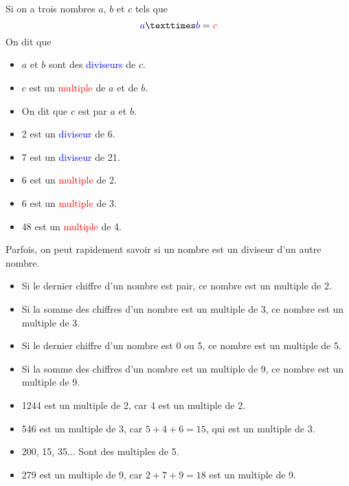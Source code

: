 \documentclass[../€Cours-complet/Cours-complet]{subfiles}
\begin{document}
\maketitleorchapter

\begin{cours}
	Si on a trois nombres $a$, $b$ et $c$ tels que
	$$ \textcolor{blue}{a} × \textcolor{blue}{b} = \textcolor{red}{c} $$
	On dit que
	\begin{itemize}
		\setlength\itemsep{0.3em}
		\item $a$ et $b$ sont des \textcolor{blue}{diviseurs} de $c$.
		\item $c$ est un \textcolor{red}{multiple} de $a$ et de $b$.
		\item On dit que $c$ est  par $a$ et $b$.
	\end{itemize}
\end{cours}

\begin{exemple}
	\begin{itemize}
		\setlength\itemsep{0.3em}
		\item 2 est un \textcolor{blue}{diviseur} de 6.
		\item 7 est un \textcolor{blue}{diviseur} de 21.
		\item 6 est un \textcolor{red}{multiple} de 2.
		\item 6 est un \textcolor{red}{multiple} de 3.
		\item 48 est un \textcolor{red}{multiple} de 4.
	\end{itemize}
\end{exemple}

\begin{cours} \label{cours:criteres-de-divisibilite}
	Parfois, on peut rapidement savoir si un nombre est un diviseur d'un autre nombre. \\
	\begin{itemize}
		\setlength\itemsep{0.3em}
		\item Si le dernier chiffre d'un nombre est pair, ce nombre est un multiple de 2.
		\item Si la somme des chiffres d'un nombre est un multiple de 3, ce nombre est un multiple de 3.
		\item Si le dernier chiffre d'un nombre est 0 ou 5, ce nombre est un multiple de 5.
		\item Si la somme des chiffres d'un nombre est un multiple de 9, ce nombre est un multiple de 9.
	\end{itemize}
\end{cours}

\begin{exemple}
	\begin{itemize}
		\setlength\itemsep{0.3em}
		\item 1244 est un multiple de 2, car 4 est un multiple de 2.
		\item 546 est un multiple de 3, car $5 + 4 + 6 = 15$, qui est un multiple de 3.
		\item 200, 15, 35... Sont des multiples de 5.
		\item 279 est un multiple de 9, car $2 + 7 + 9 = 18$ est un multiple de 9.
	\end{itemize}
\end{exemple}
\end{document}
